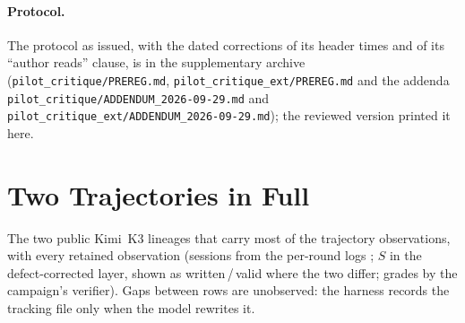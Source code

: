 \paragraph{Protocol.} The protocol as issued, with the dated corrections of its header times and of its ``author reads'' clause, is in the supplementary archive (\texttt{pilot\_critique/\allowbreak PREREG.md}, \texttt{pilot\_critique\_ext/\allowbreak PREREG.md} and the addenda \texttt{pilot\_critique/\allowbreak ADDENDUM\_2026-09-29.md} and \texttt{pilot\_critique\_ext/\allowbreak ADDENDUM\_2026-09-29.md}); the reviewed version printed it here.

\section{Two Trajectories in Full}
\label{app:traj2}
The two public Kimi~K3 lineages that carry most of the trajectory observations, with every retained observation (sessions from the per-round logs \citep{deedy2026imo}; $S$ in the defect-corrected layer, shown as written\,/\,valid where the two differ; grades by the campaign's verifier). Gaps between rows are unobserved: the harness records the tracking file only when the model rewrites it.

